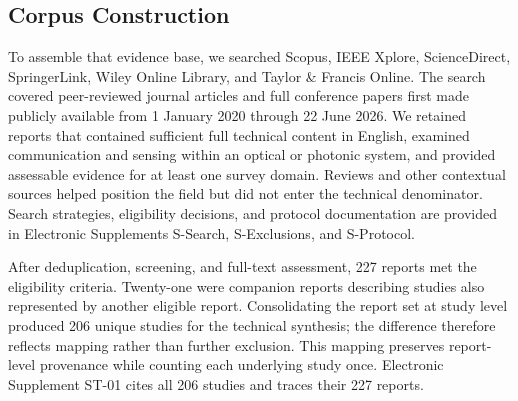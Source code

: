 \subsection{Corpus Construction}

To assemble that evidence base, we searched Scopus, IEEE Xplore, ScienceDirect,
SpringerLink, Wiley Online Library, and Taylor \& Francis Online. The search
covered peer-reviewed journal articles and full conference papers first made
publicly available from 1 January 2020 through 22 June 2026. We retained reports
that contained sufficient full technical content in English, examined
communication and sensing within an optical or photonic system, and provided
assessable evidence for at least one survey domain. Reviews and other contextual
sources helped position the field but did not enter the technical denominator.
Search strategies, eligibility decisions, and protocol documentation are
provided in Electronic Supplements S-Search, S-Exclusions, and S-Protocol.

After deduplication, screening, and full-text assessment, 227 reports met the
eligibility criteria. Twenty-one were companion reports describing studies also
represented by another eligible report. Consolidating the report set at study
level produced 206 unique studies for the technical synthesis; the difference
therefore reflects mapping rather than further exclusion. This mapping
preserves report-level provenance while counting each underlying study once.
Electronic Supplement ST-01 cites all 206 studies and traces their 227 reports.

